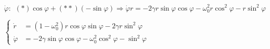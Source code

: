 $\dot{\varphi}:\ \ (*) \cos\varphi + (**)(-\sin\varphi) \Longrightarrow \dot{\varphi}r = -2\gamma r\sin \varphi\cos\varphi -\omega_0^2 r\cos^2\varphi - r\sin^2\varphi$

$\left\{\begin{aligned}
    \dot{r} &= (1-\omega^2_0)r\cos\varphi\sin\varphi - 2\gamma r\sin^2\varphi\\
    \dot{\varphi} &= -2\gamma \sin \varphi\cos\varphi -\omega_0^2 \cos^2\varphi - \sin^2\varphi
\end{aligned}\right.$





